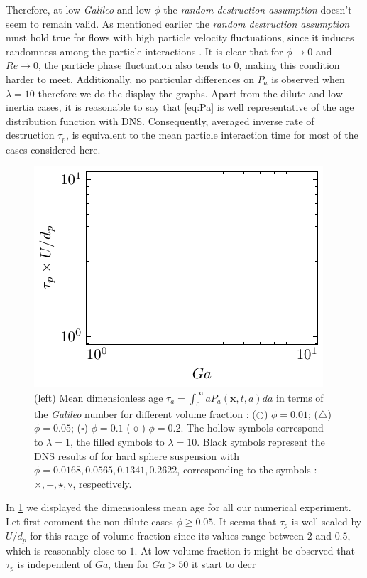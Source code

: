 Therefore, at low \textit{Galileo} and low $\phi$ the \textit{random destruction assumption} doesn't seem to remain valid. 
As mentioned earlier the \textit{random destruction assumption} must hold true for flows with high particle velocity fluctuations, since it induces randomness among the particle interactions \citep{zhang2023evolution}. 
It is clear that for $\phi \to 0$ and $Re \to 0$, the particle phase fluctuation also tends to $0$, making this condition harder to meet. 
Additionally, no particular differences on $P_a$ is observed when $\lambda = 10 $ therefore we do the display the graphs. 
Apart from the dilute and low inertia cases, it is reasonable to say that \ref{eq:Pa} is well representative of the age distribution function with DNS.
Consequently, averaged inverse rate of destruction $\tau_p$, is equivalent to the mean particle interaction time for most of the cases considered here.  


\begin{figure}[h!]
    \centering
    \includegraphics[height = 0.3\textwidth]{image/HOMOGENEOUS_NEW/tau_Ga.pdf}
    \caption{
    (left) Mean dimensionless age $\tau_a =  \int_0^\infty aP_a(\textbf{x},t,a)da$ in terms of the \textit{Galileo} number for different volume fraction :   
    ($\pmb\bigcirc$) $\phi = 0.01$; ($\pmb\triangle$) $ \phi = 0.05$; ($\pmb\square$) $\phi = 0.1$ ($\pmb\lozenge$) $\phi = 0.2$.
    The hollow symbols correspond to $\lambda = 1$, the filled symbols to $\lambda = 10$.
    Black symbols represent the DNS results of \citet{zhang2023evolution} for hard sphere suspension with $\phi = 0.0168,0.0565,0.1341,0.2622$, corresponding to the symbols : $\pmb\times, \pmb +, \pmb\star , \pmb\triangledown$, respectively.
    }
    \label{fig:tau_p}
\end{figure}
In \ref{fig:tau_p} we displayed the dimensionless mean age for all our numerical experiment. 
Let first comment the non-dilute cases $\phi\geq 0.05$. 
It seems that $\tau_p$ is well scaled by $U/d_p$ for this range of volume fraction since its values range between $2$ and $0.5$, which is reasonably close to $1$. 
At low volume fraction it might be observed that $\tau_p$ is independent of $Ga$, then for $Ga > 50$ it start to decr

